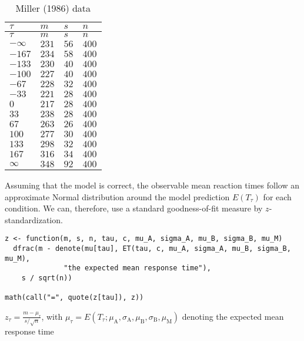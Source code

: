 \hypertarget{tab:miller-data}{}
\begin{longtable}[]{@{}llll@{}}
\caption{Miller (1986) data}\tabularnewline
\toprule\noalign{}
\(\tau\) & \(m\) & \(s\) & \(n\) \\
\midrule\noalign{}
\endfirsthead
\toprule\noalign{}
\(\tau\) & \(m\) & \(s\) & \(n\) \\
\midrule\noalign{}
\endhead
\bottomrule\noalign{}
\endlastfoot
\({-}{\infty}\) & \(231\) & \(56\) & \(400\) \\
\({-}{167}\) & \(234\) & \(58\) & \(400\) \\
\({-}{133}\) & \(230\) & \(40\) & \(400\) \\
\({-}{100}\) & \(227\) & \(40\) & \(400\) \\
\({-}{67}\) & \(228\) & \(32\) & \(400\) \\
\({-}{33}\) & \(221\) & \(28\) & \(400\) \\
\(0\) & \(217\) & \(28\) & \(400\) \\
\(33\) & \(238\) & \(28\) & \(400\) \\
\(67\) & \(263\) & \(26\) & \(400\) \\
\(100\) & \(277\) & \(30\) & \(400\) \\
\(133\) & \(298\) & \(32\) & \(400\) \\
\(167\) & \(316\) & \(34\) & \(400\) \\
\(\infty\) & \(348\) & \(92\) & \(400\) \\
\end{longtable}

Assuming that the model is correct, the observable mean reaction times
follow an approximate Normal distribution around the model prediction
\(E(T_\tau)\) for each condition. We can, therefore, use a standard
goodness-of-fit measure by \(z\)-standardization.

\begin{verbatim}
z <- function(m, s, n, tau, c, mu_A, sigma_A, mu_B, sigma_B, mu_M)
  dfrac(m - denote(mu[tau], ET(tau, c, mu_A, sigma_A, mu_B, sigma_B, mu_M),
              "the expected mean response time"),
    s / sqrt(n))

math(call("=", quote(z[tau]), z))
\end{verbatim}

\({{z}_{\tau}}{=}{\displaystyle{\frac{{m}{-}{{\mu}_{\tau}}}{{s}{/}{\sqrt{n}}}}}\),
with
\({{\mu}_{\tau}}{=}{E{\left({{T}_{\tau}}{;}{{{\mu}_{\mathrm{A}}}{{,}{{\sigma}_{\mathrm{A}}}{{,}{{\mu}_{\mathrm{B}}}{{,}{{\sigma}_{\mathrm{B}}}{{,}{{\mu}_{\mathrm{M}}}}}}}}\right)}}\)
denoting the expected mean response time

